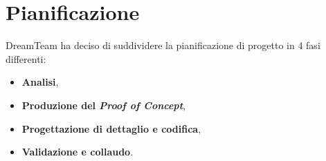 \section{Pianificazione}
DreamTeam ha deciso di suddividere la pianificazione di progetto in 4 fasi differenti:

\begin{itemize}
\item \textbf{Analisi},
\item \textbf{Produzione del \textit{Proof of Concept}\glo{}},
\item \textbf{Progettazione di dettaglio e codifica},
\item \textbf{Validazione e collaudo}.
\end{itemize}









